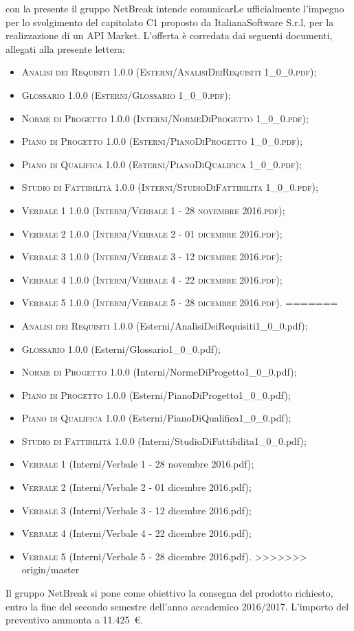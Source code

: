 \documentclass[11pt,a4paper]{letter}
\begin{document}
\begin{letter}
\indent con la presente il gruppo NetBreak intende comunicarLe ufficialmente l'impegno per lo svolgimento del capitolato C1 proposto da ItalianaSoftware S.r.l, per la realizzazione di un API Market.
L'offerta \`e corredata dai seguenti documenti, allegati alla presente lettera:
\begin{itemize}
<<<<<<< HEAD
	\item \textsc{Analisi dei Requisiti 1.0.0 (Esterni/AnalisiDeiRequisiti 1\_0\_0.pdf)}; 
	\item \textsc{Glossario 1.0.0 (Esterni/Glossario 1\_0\_0.pdf)}; 
	\item \textsc{Norme di Progetto 1.0.0 (Interni/NormeDiProgetto 1\_0\_0.pdf)}; 
	\item \textsc{Piano di Progetto 1.0.0 (Esterni/PianoDiProgetto 1\_0\_0.pdf)}; 
	\item \textsc{Piano di Qualifica 1.0.0 (Esterni/PianoDiQualifica 1\_0\_0.pdf)}; 
	\item \textsc{Studio di Fattibilit\`a 1.0.0 (Interni/StudioDiFattibilita 1\_0\_0.pdf)}; 
	\item \textsc{Verbale 1 1.0.0 (Interni/Verbale 1 - 28 novembre 2016.pdf)}; 
	\item \textsc{Verbale 2 1.0.0 (Interni/Verbale 2 - 01 dicembre 2016.pdf)}; 
	\item \textsc{Verbale 3 1.0.0 (Interni/Verbale 3 - 12 dicembre 2016.pdf)}; 
	\item \textsc{Verbale 4 1.0.0 (Interni/Verbale 4 - 22 dicembre 2016.pdf)}; 
	\item \textsc{Verbale 5 1.0.0 (Interni/Verbale 5 - 28 dicembre 2016.pdf)}. 
=======
	\item \textsc{Analisi dei Requisiti 1.0.0} (Esterni/AnalisiDeiRequisiti1\_0\_0.pdf); 
	\item \textsc{Glossario 1.0.0} (Esterni/Glossario1\_0\_0.pdf); 
	\item \textsc{Norme di Progetto 1.0.0} (Interni/NormeDiProgetto1\_0\_0.pdf); 
	\item \textsc{Piano di Progetto 1.0.0} (Esterni/PianoDiProgetto1\_0\_0.pdf); 
	\item \textsc{Piano di Qualifica 1.0.0} (Esterni/PianoDiQualifica1\_0\_0.pdf); 
	\item \textsc{Studio di Fattibilit\`a 1.0.0} (Interni/StudioDiFattibilita1\_0\_0.pdf); 
	\item \textsc{Verbale 1} (Interni/Verbale 1 - 28 novembre 2016.pdf); 
	\item \textsc{Verbale 2} (Interni/Verbale 2 - 01 dicembre 2016.pdf); 
	\item \textsc{Verbale 3} (Interni/Verbale 3 - 12 dicembre 2016.pdf); 
	\item \textsc{Verbale 4} (Interni/Verbale 4 - 22 dicembre 2016.pdf); 
	\item \textsc{Verbale 5} (Interni/Verbale 5 - 28 dicembre 2016.pdf). 
>>>>>>> origin/master
\end{itemize}
	Il gruppo NetBreak si pone come obiettivo la consegna del prodotto richiesto, entro la fine del secondo semestre dell'anno accademico 2016/2017. L'importo del preventivo ammonta a \hbox{11.425 \euro{}.}


\end{letter}
\end{document}
